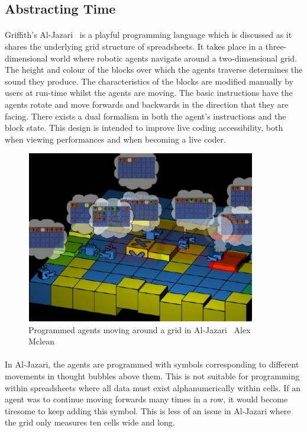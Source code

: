 \subsection{Abstracting Time} \label{abstractingTime}

\paragraph{} Griffith's Al-Jazari~\cite{mclean:visualisation} is a playful programming language which is discussed as it shares the underlying grid structure of spreadsheets. It takes place in a three-dimensional world where robotic agents navigate around a two-dimensional grid. The height and colour of the blocks over which the agents traverse determines the sound they produce. The characteristics of the blocks are modified manually by users at run-time whilst the agents are moving. The basic instructions have the agents rotate and move forwards and backwards in the direction that they are facing. There exists a dual formalism in both the agent's instructions and the block state. This design is intended to improve live coding accessibility, both when viewing performances and when becoming a live coder.

\begin{figure}[ht]
  \centerline{\includegraphics[width=100mm]{figs/alJazari.jpg}}
\caption{Programmed agents moving around a grid in Al-Jazari \textcopyright\ Alex Mclean \cite{mclean:texture}}
\label{prep:alJazari}
\end{figure}

\vspace{-20pt}
\paragraph{} In Al-Jazari, the agents are programmed with symbols corresponding to different movements in thought bubbles above them. This is not suitable for programming within spreadsheets where all data must exist alphanumerically within cells. If an agent was to continue moving forwards many times in a row, it would become tiresome to keep adding this symbol. This is less of an issue in Al-Jazari where the grid only measures ten cells wide and long.

